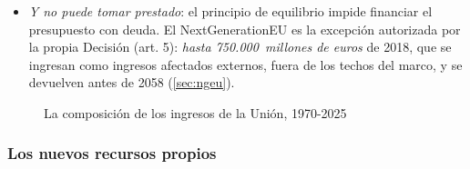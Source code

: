 \documentclass[11pt]{article}
\begin{document}
\begin{itemize}
\item \emph{Y no puede tomar prestado}: el principio de equilibrio impide financiar el presupuesto con deuda. El NextGenerationEU es la excepción autorizada por la propia Decisión (art. 5): \emph{hasta 750.000~millones de euros} de 2018, que se ingresan como ingresos afectados externos, fuera de los techos del marco, y se devuelven antes de 2058\nocite{UE2020DRP} (\ref{sec:ngeu}).
\end{itemize}

\begin{figure}[H]
\centering
\caption{La composición de los ingresos de la Unión, 1970-2025}\label{fig:ingresos}
\end{figure}

\subsubsection{Los nuevos recursos propios}\label{sec:nuevos-recursos}
\end{document}

